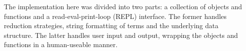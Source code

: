 The implementation here was divided into two parts: a collection of objects and functions and a read-eval-print-loop (REPL) interface.
The former handles reduction strategies, string formatting of terms and the underlying data structure.
The latter handles user input and output, wrapping the objects and functions in a human-useable manner.

